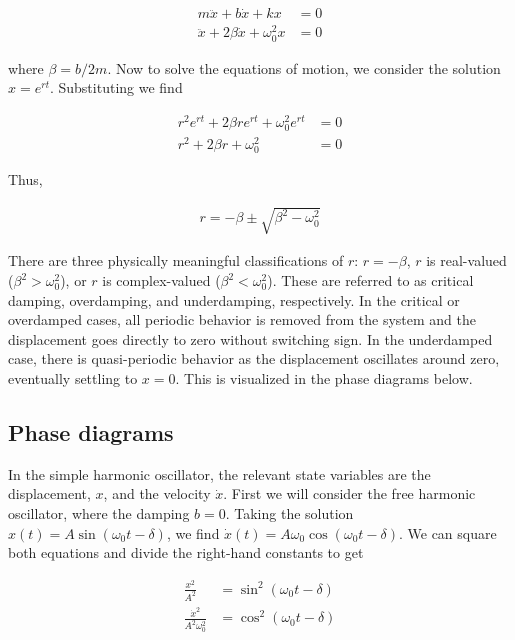 \documentclass[10pt,letterpaper]{article}
\begin{document}
\begin{align*}
    m \ddot{x} + b \dot{x} + k x & = 0 \\
    \ddot{x} + 2\beta \dot{x} + \omega_0^2 x & = 0
    \label{eq:damped-sho}
\end{align*}

\noindent
where $\beta = b/2m$.
Now to solve the equations of motion, we consider the solution $x = e^{rt}$.
Substituting we find 

\begin{align*}
    r^2 e^{rt} + 2 \beta r e^{rt} + \omega_0^2 e^{rt} & = 0 \\
    r^2 + 2 \beta r + \omega_0^2  & = 0
\end{align*}

\noindent
Thus,

\begin{align*}
    r = -\beta \pm \sqrt{\beta^2 - \omega_0^2}
\end{align*}

\noindent
There are three physically meaningful classifications of $r$: 
$r = -\beta$, $r$ is real-valued ($\beta^2 > \omega_0^2$), or 
$r$ is complex-valued ($\beta^2 < \omega_0^2$). These are referred to as
critical damping, overdamping, and underdamping, respectively. In the 
critical or overdamped cases, all periodic behavior is removed from the system
and the displacement goes directly to zero without switching sign. In the
underdamped case, there is quasi-periodic behavior as the displacement 
oscillates around zero, eventually settling to $x=0$. This is visualized 
in the phase diagrams below.

\subsection{Phase diagrams}
\label{sub:phase-diagrams}

In the simple harmonic oscillator, the relevant state variables are the 
displacement, $x$, and the velocity $\dot{x}$. First we will consider the
free harmonic oscillator, where the damping $b=0$. Taking the solution 
$x(t) = A \sin(\omega_0 t - \delta)$, we find 
$\dot{x}(t) = A\omega_0 \cos(\omega_0 t - \delta)$. We can square both equations
and divide the right-hand constants to get

\begin{align*}
    \frac{x^2}{A^2} & = \sin^2(\omega_0t - \delta) \\
    \frac{\dot{x}^2}{A^2\omega_0^2} & = \cos^2(\omega_0 t - \delta)
\end{align*}
\end{document}

